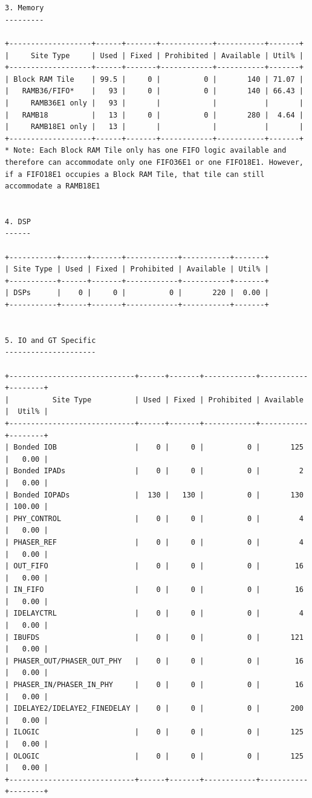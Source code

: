 \documentclass[11pt]{article}
\begin{document}
{\small
\begin{verbatim}


3. Memory
---------

+-------------------+------+-------+------------+-----------+-------+
|     Site Type     | Used | Fixed | Prohibited | Available | Util% |
+-------------------+------+-------+------------+-----------+-------+
| Block RAM Tile    | 99.5 |     0 |          0 |       140 | 71.07 |
|   RAMB36/FIFO*    |   93 |     0 |          0 |       140 | 66.43 |
|     RAMB36E1 only |   93 |       |            |           |       |
|   RAMB18          |   13 |     0 |          0 |       280 |  4.64 |
|     RAMB18E1 only |   13 |       |            |           |       |
+-------------------+------+-------+------------+-----------+-------+
* Note: Each Block RAM Tile only has one FIFO logic available and therefore can accommodate only one FIFO36E1 or one FIFO18E1. However, if a FIFO18E1 occupies a Block RAM Tile, that tile can still accommodate a RAMB18E1


4. DSP
------

+-----------+------+-------+------------+-----------+-------+
| Site Type | Used | Fixed | Prohibited | Available | Util% |
+-----------+------+-------+------------+-----------+-------+
| DSPs      |    0 |     0 |          0 |       220 |  0.00 |
+-----------+------+-------+------------+-----------+-------+


5. IO and GT Specific
---------------------

+-----------------------------+------+-------+------------+-----------+--------+
|          Site Type          | Used | Fixed | Prohibited | Available |  Util% |
+-----------------------------+------+-------+------------+-----------+--------+
| Bonded IOB                  |    0 |     0 |          0 |       125 |   0.00 |
| Bonded IPADs                |    0 |     0 |          0 |         2 |   0.00 |
| Bonded IOPADs               |  130 |   130 |          0 |       130 | 100.00 |
| PHY_CONTROL                 |    0 |     0 |          0 |         4 |   0.00 |
| PHASER_REF                  |    0 |     0 |          0 |         4 |   0.00 |
| OUT_FIFO                    |    0 |     0 |          0 |        16 |   0.00 |
| IN_FIFO                     |    0 |     0 |          0 |        16 |   0.00 |
| IDELAYCTRL                  |    0 |     0 |          0 |         4 |   0.00 |
| IBUFDS                      |    0 |     0 |          0 |       121 |   0.00 |
| PHASER_OUT/PHASER_OUT_PHY   |    0 |     0 |          0 |        16 |   0.00 |
| PHASER_IN/PHASER_IN_PHY     |    0 |     0 |          0 |        16 |   0.00 |
| IDELAYE2/IDELAYE2_FINEDELAY |    0 |     0 |          0 |       200 |   0.00 |
| ILOGIC                      |    0 |     0 |          0 |       125 |   0.00 |
| OLOGIC                      |    0 |     0 |          0 |       125 |   0.00 |
+-----------------------------+------+-------+------------+-----------+--------+



\end{verbatim}}
\end{document}
